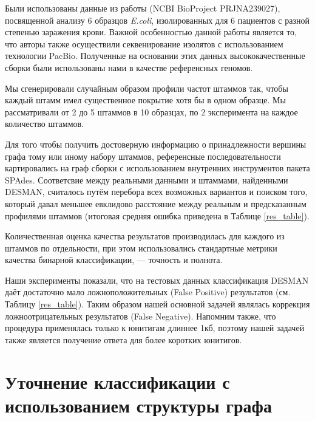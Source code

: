 \documentclass{spbau-diploma}
\begin{document}
Были использованы данные из работы \cite{isolates} (NCBI BioProject PRJNA239027), посвященной анализу 6 образцов \textit{E.coli}, изолированных для 6 пациентов с разной степенью заражения крови. Важной особенностью данной работы является то, что авторы также осуществили секвенирование изолятов с использованием технологии PacBio. Полученные на основании этих данных высококачественные сборки были использованы нами в качестве референсных геномов.

Мы сгенерировали случайным образом профили частот штаммов так, чтобы каждый штамм имел существенное покрытие хотя бы в одном образце. Мы рассматривали от 2 до 5 штаммов в 10 образцах, по 2 эксперимента на каждое количество штаммов.%

Для того чтобы получить достоверную информацию о принадлежности вершины графа тому или иному набору штаммов, референсные последовательности картировались на граф сборки с использованием внутренних инструментов пакета SPAdes. Соответсвие между реальными данными и штаммами, найденными DESMAN, считалось путём перебора всех возможных вариантов и поиском того, который давал меньшее евклидово расстояние между реальным и предсказанным профилями штаммов (итоговая средняя ошибка приведена в Таблице \ref{res_table}).

Количественная оценка качества результатов производилась для каждого из штаммов по отдельности, при этом использовались стандартные метрики качества бинарной классификации, --- точность и полнота.

Наши эксперименты показали, что на тестовых данных классификация DESMAN даёт достаточно мало ложноположительных (False Positive) результатов (см. Таблицу \ref{res_table}). Таким образом нашей основной задачей являлась коррекция ложноотрицательных результатов (False Negative). Напомним также, что процедура применялась только к юнитигам длиннее 1кб, поэтому нашей задачей также является получение ответа для более коротких юнитигов. 




\section{Уточнение классификации с использованием структуры графа}
\end{document}

